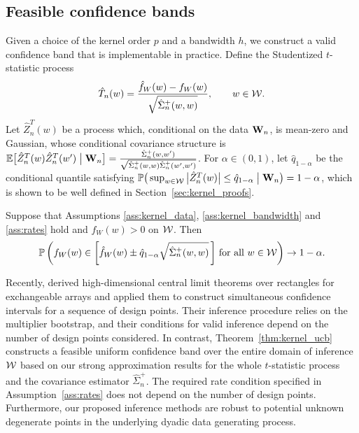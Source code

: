 \subsection{Feasible confidence bands}
\label{sec:feasible_confidence_bands}

Given a choice of the kernel order $p$
and a bandwidth $h$, we construct a valid confidence
band that is implementable in practice.
Define the Studentized $t$-statistic process
%
\[ \hat T_n(w) = \frac{\hat{f}_W(w) - f_W(w)}{\sqrt{\hat
\Sigma_n^+(w,w)}} , \qquad w\in\mathcal{W}.\]
%
Let $\hat Z_n^T(w)$ be a process which,
conditional on the data $\mathbf{W}_n$,
is mean-zero and Gaussian, whose
conditional covariance structure is
$\mathbb{E}\big[ \hat Z_n^T(w) \hat Z_n^T(w') \bigm\vert \mathbf{W}_n \big]
= \frac{\hat \Sigma_n^+(w,w')}
{\sqrt{\hat \Sigma_n^+(w,w) \hat \Sigma_n^+(w',w')}}$.
For $\alpha \in (0,1)$, let $\hat q_{1-\alpha}$ be the
conditional quantile satisfying
%
$ \mathbb{P}\big(\sup_{w \in \mathcal{W}}
  \big| \hat Z_n^T(w) \big|
  \leq \hat q_{1-\alpha}
\bigm\vert \mathbf{W}_n \big)
= 1 - \alpha$,
%
which is shown to be well defined in Section~\ref{sec:kernel_proofs}.

\begin{theorem}
  \label{thm:kernel_ucb}

  Suppose that Assumptions \ref{ass:kernel_data}, \ref{ass:kernel_bandwidth}
  and \ref{ass:rates} hold and $f_W(w) > 0$ on $\mathcal{W}$. Then
  \begin{align*}
    \mathbb{P}\left(
      f_W(w)
      \in
      \left[
        \hat f_W(w)
        \pm
        \hat q_{1-\alpha}
        \sqrt{\hat\Sigma_n^+(w,w)}
      \,\right]
      \,\textup{for all }
      w \in \mathcal{W}
    \right)
    \to 1 - \alpha.
  \end{align*}
\end{theorem}

Recently, \citet{chiang2022inference} derived high-dimensional central limit
theorems over rectangles for exchangeable arrays and applied them to construct
simultaneous confidence intervals for a sequence of design points. Their
inference procedure relies on the multiplier bootstrap,
and their conditions for valid inference
depend on the number of design points considered.
In contrast, Theorem~\ref{thm:kernel_ucb} constructs a feasible uniform
confidence band
over the entire domain of inference $\mathcal{W}$ based on our strong
approximation results for the whole $t$-statistic process
and the covariance estimator $\hat\Sigma_n^+$.
The required rate condition specified in
Assumption~\ref{ass:rates} does not depend on the number of design points.
Furthermore, our proposed inference methods are robust to potential
unknown degenerate points in the underlying dyadic data generating process.

